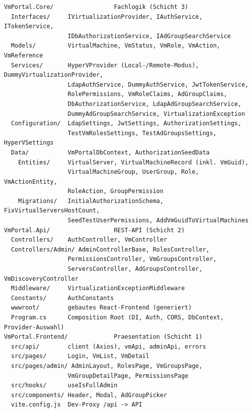 \documentclass[12pt,a4paper]{article}
\begin{document}
\begin{lstlisting}[caption={Projektstruktur der VmPortal-Solution}, label={lst:struktur}]
VmPortal.Core/                 Fachlogik (Schicht 3)
  Interfaces/     IVirtualizationProvider, IAuthService, ITokenService,
                  IDbAuthorizationService, IAdGroupSearchService
  Models/         VirtualMachine, VmStatus, VmRole, VmAction, VmReference
  Services/       HyperVProvider (Local-/Remote-Modus), DummyVirtualizationProvider,
                  LdapAuthService, DummyAuthService, JwtTokenService,
                  RolePermissions, VmRoleClaims, AdGroupClaims,
                  DbAuthorizationService, LdapAdGroupSearchService,
                  DummyAdGroupSearchService, VirtualizationException
  Configuration/  LdapSettings, JwtSettings, AuthorizationSettings,
                  TestVmRolesSettings, TestAdGroupsSettings, HyperVSettings
  Data/           VmPortalDbContext, AuthorizationSeedData
    Entities/     VirtualServer, VirtualMachineRecord (inkl. VmGuid),
                  VirtualMachineGroup, UserGroup, Role, VmActionEntity,
                  RoleAction, GroupPermission
    Migrations/   InitialAuthorizationSchema, FixVirtualServersHostCount,
                  SeedTestUserPermissions, AddVmGuidToVirtualMachines
VmPortal.Api/                  REST-API (Schicht 2)
  Controllers/    AuthController, VmController
  Controllers/Admin/ AdminControllerBase, RolesController,
                  PermissionsController, VmGroupsController,
                  ServersController, AdGroupsController, VmDiscoveryController
  Middleware/     VirtualizationExceptionMiddleware
  Constants/      AuthConstants
  wwwroot/        gebautes React-Frontend (generiert)
  Program.cs      Composition Root (DI, Auth, CORS, DbContext, Provider-Auswahl)
VmPortal.Frontend/             Praesentation (Schicht 1)
  src/api/        client (Axios), vmApi, adminApi, errors
  src/pages/      Login, VmList, VmDetail
  src/pages/admin/ AdminLayout, RolesPage, VmGroupsPage,
                  VmGroupDetailPage, PermissionsPage
  src/hooks/      useIsFullAdmin
  src/components/ Header, Modal, AdGroupPicker
  vite.config.js  Dev-Proxy /api -> API
\end{lstlisting}
\end{document}
